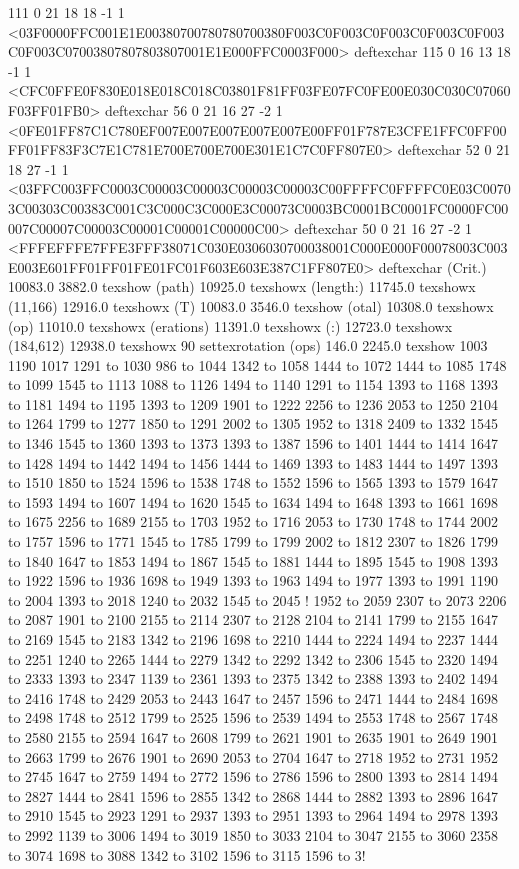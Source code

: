 111 0 21 18 18 -1 1 {{<03F0000FFC001E1E00380700780780700380F003C0F003C0F003C0F003C0F003C0F003C07003807807803807001E1E000FFC0003F000>}} deftexchar
115 0 16 13 18 -1 1 {{<CFC0FFE0F830E018E018C018C03801F81FF03FE07FC0FE00E030C030C07060F03FF01FB0>}} deftexchar
56 0 21 16 27 -2 1 {{<0FE01FF87C1C780EF007E007E007E007E007E00FF01F787E3CFE1FFC0FF00FF01FF83F3C7E1C781E700E700E700E301E1C7C0FF807E0>}} deftexchar
52 0 21 18 27 -1 1 {{<03FFC003FFC0003C00003C00003C00003C00003C00FFFFC0FFFFC0E03C00703C00303C00383C001C3C000C3C000E3C00073C0003BC0001BC0001FC0000FC00007C00007C00003C00001C00001C00000C00>}} deftexchar
50 0 21 16 27 -2 1 {{<FFFEFFFE7FFE3FFF38071C030E0306030700038001C000E000F00078003C003E003E601FF01FF01FE01FC01F603E603E387C1FF807E0>}} deftexchar
(Crit.) 10083.0 3882.0 texshow
(path) 10925.0 texshowx
(length:) 11745.0 texshowx
(11,166) 12916.0 texshowx
(T) 10083.0 3546.0 texshow
(otal) 10308.0 texshowx
(op) 11010.0 texshowx
(erations) 11391.0 texshowx
(:) 12723.0 texshowx
(184,612) 12938.0 texshowx
90 settexrotation
(ops) 146.0 2245.0 texshow
1003 1190 1017 1291 to 1030 986 to 1044 1342 to 1058 1444 to 1072 1444 to 1085 1748 to 1099 1545 to 1113 1088 to 1126 1494 to 1140 1291 to 1154 1393 to 1168 1393 to 1181 1494 to 1195 1393 to 1209 1901 to 1222 2256 to 1236 2053 to 1250 2104 to 1264 1799 to 1277 1850 to 1291 2002 to 1305 1952 to 1318 2409 to 1332 1545 to 1346 1545 to 1360 1393 to 1373 1393 to 1387 1596 to 1401 1444 to 1414 1647 to 1428 1494 to 1442 1494 to 1456 1444 to 1469 1393 to 1483 1444 to 1497 1393 to 1510 1850 to 1524 1596 to 1538 1748 to 1552 1596 to 1565 1393 to 1579 1647 to 1593 1494 to 1607 1494 to 1620 1545 to 1634 1494 to 1648 1393 to 1661 1698 to 1675 2256 to 1689 2155 to 1703 1952 to 1716 2053 to 1730 1748 to 1744 2002 to 1757 1596 to 1771 1545 to 1785 1799 to 1799 2002 to 1812 2307 to 1826 1799 to 1840 1647 to 1853 1494 to 1867 1545 to 1881 1444 to 1895 1545 to 1908 1393 to 1922 1596 to 1936 1698 to 1949 1393 to 1963 1494 to 1977 1393 to 1991 1190 to 2004 1393 to 2018 1240 to 2032 1545 to 2045 !
1952 to 2059 2307 to 2073 2206 to 
2087 1901 to 2100 2155 to 2114 2307 to 2128 2104 to 2141 1799 to 2155 1647 to 2169 1545 to 2183 1342 to 2196 1698 to 2210 1444 to 2224 1494 to 2237 1444 to 2251 1240 to 2265 1444 to 2279 1342 to 2292 1342 to 2306 1545 to 2320 1494 to 2333 1393 to 2347 1139 to 2361 1393 to 2375 1342 to 2388 1393 to 2402 1494 to 2416 1748 to 2429 2053 to 2443 1647 to 2457 1596 to 2471 1444 to 2484 1698 to 2498 1748 to 2512 1799 to 2525 1596 to 2539 1494 to 2553 1748 to 2567 1748 to 2580 2155 to 2594 1647 to 2608 1799 to 2621 1901 to 2635 1901 to 2649 1901 to 2663 1799 to 2676 1901 to 2690 2053 to 2704 1647 to 2718 1952 to 2731 1952 to 2745 1647 to 2759 1494 to 2772 1596 to 2786 1596 to 2800 1393 to 2814 1494 to 2827 1444 to 2841 1596 to 2855 1342 to 2868 1444 to 2882 1393 to 2896 1647 to 2910 1545 to 2923 1291 to 2937 1393 to 2951 1393 to 2964 1494 to 2978 1393 to 2992 1139 to 3006 1494 to 3019 1850 to 3033 2104 to 3047 2155 to 3060 2358 to 3074 1698 to 3088 1342 to 3102 1596 to 3115 1596 to 3!
